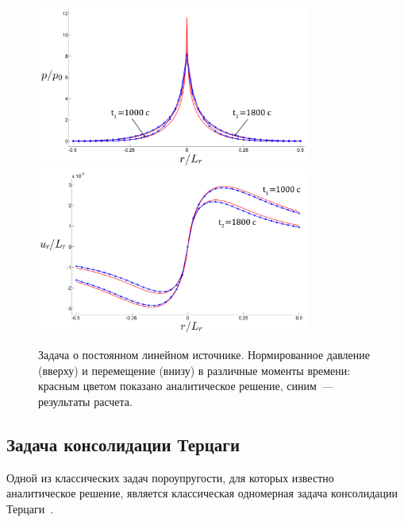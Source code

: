 \begin{figure}[t!]
\centering
  \includegraphics[width=0.8\textwidth]{figs/press_const_line_source2.png}\\
  \includegraphics[width=0.8\textwidth]{figs/disp_const_line_source2.png}
  \caption{ Задача о постоянном линейном источнике. Нормированное давление (вверху) и перемещение (внизу) в различные моменты времени: красным
цветом показано аналитическое решение, синим~--– результаты расчета.}
  \label{fig::press_const_line_source}
\end{figure}


\subsection{Задача консолидации Терцаги}

Одной из классических задач пороупругости, для которых
известно аналитическое решение, является классическая одномерная задача консолидации Терцаги~\cite{terzaghi_1996}.


